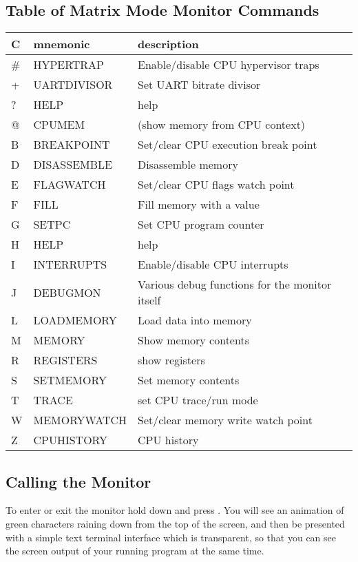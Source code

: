 \subsection{Table of Matrix Mode Monitor Commands}

{
\ttfamily
\setlength{\tabcolsep}{1mm}
\begin{center}
\begin{tabular}{|l|l|l|}
\hline
C & mnemonic & description \\
\hline
\# & HYPERTRAP & Enable/disable CPU hypervisor traps \\
+ & UARTDIVISOR & Set UART bitrate divisor \\
? & HELP & help \\
@ & CPUMEM & (show memory from CPU context) \\
\hline
B & BREAKPOINT & Set/clear CPU execution break point \\
D & DISASSEMBLE & Disassemble memory \\
E & FLAGWATCH & Set/clear CPU flags watch point \\
F & FILL & Fill memory with a value \\
G & SETPC & Set CPU program counter \\
H & HELP & help \\
I & INTERRUPTS & Enable/disable CPU interrupts \\
J & DEBUGMON & Various debug functions for the monitor itself \\
L & LOADMEMORY & Load data into memory \\
M & MEMORY & Show memory contents \\
R & REGISTERS & show registers \\
S & SETMEMORY & Set memory contents \\
T & TRACE & set CPU trace/run mode \\
W & MEMORYWATCH & Set/clear memory write watch point \\
Z & CPUHISTORY & CPU history \\
\hline
\end{tabular}
\end{center}
}

\subsection {Calling the Monitor}

To enter or exit the monitor hold down \megasymbolkey and press .
You will see an animation of green characters raining down from the top of the screen, and
then be presented with a simple text terminal interface which is transparent, so that you can
see the screen output of your running program at the same time.

